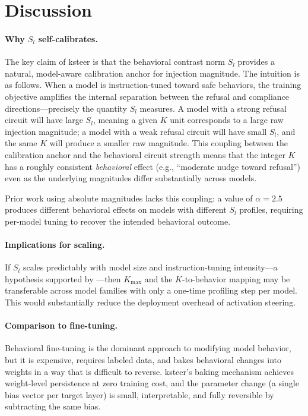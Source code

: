 \documentclass[10pt]{article}
\begin{document}
\section{Discussion}
\label{sec:discussion}

\paragraph{Why $S_l$ self-calibrates.}
The key claim of ksteer is that the behavioral contrast norm $S_l$ provides
a natural, model-aware calibration anchor for injection magnitude.  The
intuition is as follows.  When a model is instruction-tuned toward safe
behaviors, the training objective amplifies the internal separation between
the refusal and compliance directions---precisely the quantity $S_l$ measures.
A model with a strong refusal circuit will have large $S_l$, meaning a given
$K$ unit corresponds to a large raw injection magnitude; a model with a weak
refusal circuit will have small $S_l$, and the same $K$ will produce a smaller
raw magnitude.  This coupling between the calibration anchor and the behavioral
circuit strength means that the integer $K$ has a roughly consistent
\emph{behavioral} effect (e.g., ``moderate nudge toward refusal'') even as the
underlying magnitudes differ substantially across models.

Prior work using absolute magnitudes lacks this coupling: a value of $\alpha
= 2.5$ produces different behavioral effects on models with different $S_l$
profiles, requiring per-model tuning to recover the intended behavioral outcome.

\paragraph{Implications for scaling.}
If $S_l$ scales predictably with model size and instruction-tuning
intensity---a hypothesis supported by \citet{chen2025persona}---then
$K_\text{max}$ and the $K$-to-behavior mapping may be transferable across
model families with only a one-time profiling step per model.  This would
substantially reduce the deployment overhead of activation steering.

\paragraph{Comparison to fine-tuning.}
Behavioral fine-tuning \citep{ouyang2022instructgpt} is the dominant approach
to modifying model behavior, but it is expensive, requires labeled data, and
bakes behavioral changes into weights in a way that is difficult to reverse.
ksteer's baking mechanism achieves weight-level persistence at zero training
cost, and the parameter change (a single bias vector per target layer) is
small, interpretable, and fully reversible by subtracting the same bias.
\end{document}
